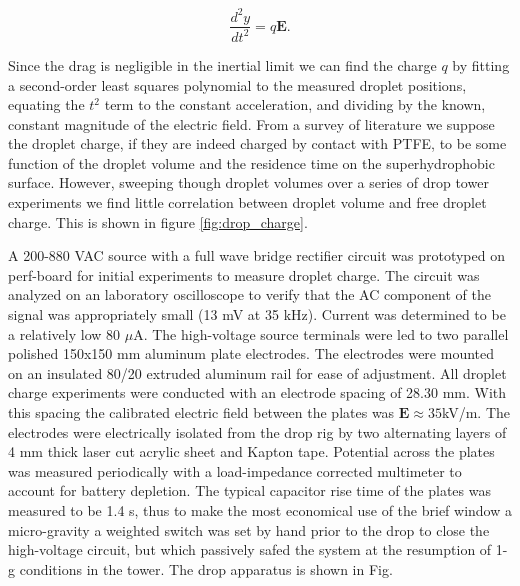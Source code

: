\documentclass[10pt,a4paper]{article}
\begin{document}
\[ \frac{d^2y}{dt^2} = q\mathbf{E}. \]

Since the drag is negligible in the inertial limit we can find the charge $q$ by fitting a second-order least squares polynomial to the measured droplet positions, equating the $t^2$ term to the constant acceleration, and dividing by the known, constant magnitude of the electric field. From a survey of literature we suppose the droplet charge, if they are indeed charged by contact with PTFE, to be some function of the droplet volume and the residence time on the superhydrophobic surface. However, sweeping though droplet volumes over a series of drop tower experiments we find little correlation between droplet volume  and free droplet charge. This is shown in figure \ref{fig:drop_charge}.

A 200-880 VAC source with a full wave bridge rectifier circuit was prototyped on perf-board for initial experiments to measure droplet charge. The circuit was analyzed on an laboratory oscilloscope to verify that the AC component of the signal was appropriately small (13 mV at 35 kHz). Current was determined to be a relatively low 80 $\mu$A. The high-voltage source terminals were led to two parallel polished 150x150 mm aluminum plate electrodes. The electrodes were mounted on an insulated 80/20 extruded aluminum rail for ease of adjustment. All droplet charge experiments were conducted with an electrode spacing of 28.30 mm. With this spacing the calibrated electric field between the plates was $\mathbf{E} \approx 35$kV/m. The electrodes were electrically isolated from the drop rig by two alternating layers of 4 mm thick laser cut acrylic sheet and Kapton tape. Potential across the plates was measured periodically with a load-impedance corrected multimeter to account for battery depletion. The typical capacitor rise time of the plates was measured to be 1.4 s, thus to make the most economical use of the brief window a micro-gravity a weighted switch was set by hand prior to the drop to close the high-voltage circuit, but which passively safed the system at the resumption of 1-g conditions in the tower. The drop apparatus is shown in Fig.



\end{document}
